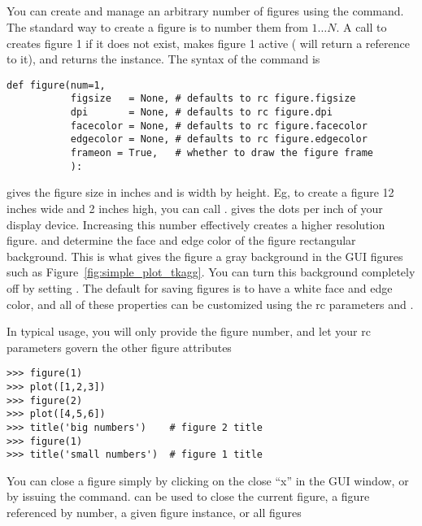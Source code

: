 \documentclass[twoside]{book}
\begin{document}
\subsection{}
\label{sec:figure}

You can create and manage an arbitrary number of figures using the
 command.  The standard way to create a figure is to
number them from $1 \dots N$.  A call to  creates
figure 1 if it does not exist, makes figure 1 active ( will
return a reference to it), and returns the
 instance.  The syntax of the
 command is

\begin{lstlisting}
def figure(num=1,
           figsize   = None, # defaults to rc figure.figsize
           dpi       = None, # defaults to rc figure.dpi
           facecolor = None, # defaults to rc figure.facecolor
           edgecolor = None, # defaults to rc figure.edgecolor
           frameon = True,   # whether to draw the figure frame
           ):
\end{lstlisting}
 gives the figure size in inches and is width by
height.  Eg, to create a figure 12 inches wide and 2 inches high, you
can call .   gives the dots per
inch of your display device.  Increasing this number effectively
creates a higher resolution figure.   and
 determine the face and edge color of the figure
rectangular background.  This is what gives the figure a gray
background in the GUI figures such as
Figure~\ref{fig:simple_plot_tkagg}.  You can turn this background
completely off by setting .  The default for
saving figures is to have a white face and edge color, and all of
these properties can be customized using the rc parameters
 and .

In typical usage, you will only provide the figure number, and let
your rc parameters govern the other figure attributes

\begin{lstlisting}
>>> figure(1)
>>> plot([1,2,3])
>>> figure(2)
>>> plot([4,5,6])
>>> title('big numbers')    # figure 2 title
>>> figure(1)
>>> title('small numbers')  # figure 1 title
\end{lstlisting}

You can close a figure simply by clicking on the close ``x'' in the
GUI window, or by issuing the  command.   can
be used to close the current figure, a figure referenced by number, a
given figure instance, or all figures
\end{document}
